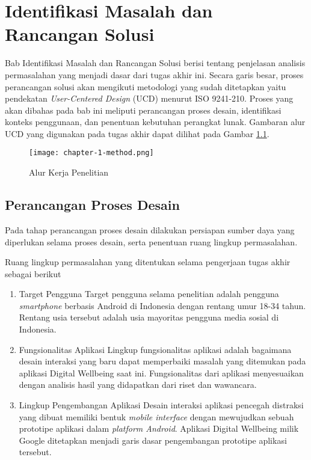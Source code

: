 \chapter{Identifikasi Masalah dan Rancangan Solusi}


Bab Identifikasi Masalah dan Rancangan Solusi berisi tentang penjelasan analisis permasalahan yang menjadi dasar dari tugas akhir ini. Secara garis besar, proses perancangan solusi akan mengikuti metodologi yang sudah ditetapkan yaitu pendekatan \textit{User-Centered Design} (UCD) menurut ISO 9241-210. Proses yang akan dibahas pada bab ini meliputi perancangan proses desain, identifikasi konteks penggunaan, dan penentuan kebutuhan perangkat lunak. Gambaran alur UCD yang digunakan pada tugas akhir dapat dilihat pada Gambar \ref{fig:diagram_alur_kerja}.

\begin{figure}[h]
  \centering
  \texttt{[image: chapter-1-method.png]}
  \caption{Alur Kerja Penelitian}
  \label{fig:diagram_alur_kerja}
\end{figure}

\section{Perancangan Proses Desain}
\label{sec:perancangan_proses_desain}

Pada tahap perancangan proses desain dilakukan persiapan sumber daya yang diperlukan selama proses desain, serta penentuan ruang lingkup permasalahan.


Ruang lingkup permasalahan yang ditentukan selama pengerjaan tugas akhir sebagai berikut

\begin{enumerate}
  \item Target Pengguna
  \subitem Target pengguna selama penelitian adalah pengguna \textit{smartphone} berbasis Android di Indonesia dengan rentang umur 18-34 tahun. Rentang usia tersebut adalah usia mayoritas pengguna media sosial di Indonesia. \parencite{mediasosial2020} 
  
  \item Fungsionalitas Aplikasi
  \subitem Lingkup fungsionalitas aplikasi adalah bagaimana desain interaksi yang baru dapat memperbaiki masalah yang ditemukan pada aplikasi Digital Wellbeing saat ini. Fungsionalitas dari aplikasi menyesuaikan dengan analisis hasil yang didapatkan dari riset dan wawancara. 
   
  \item Lingkup Pengembangan Aplikasi
  \subitem Desain interaksi aplikasi pencegah distraksi yang dibuat memiliki bentuk \textit{mobile interface} dengan mewujudkan sebuah prototipe aplikasi dalam \textit{platform Android}. Aplikasi Digital Wellbeing milik Google ditetapkan menjadi garis dasar pengembangan prototipe aplikasi tersebut.

\end{enumerate}

